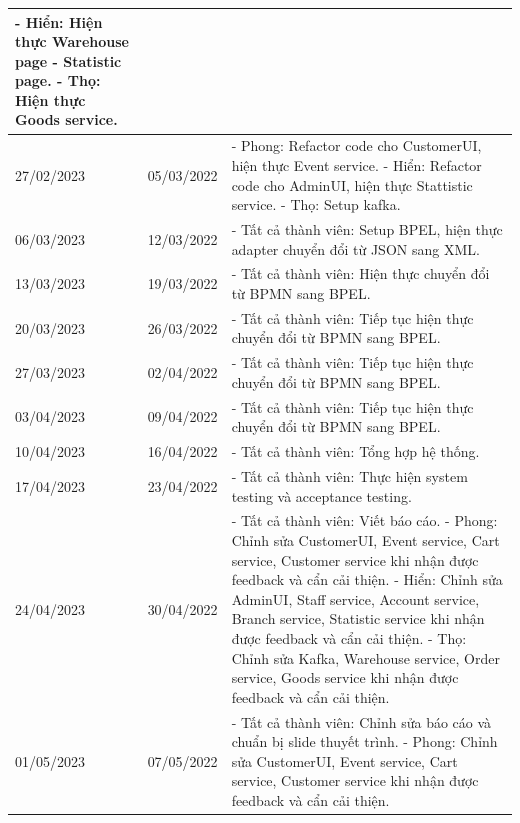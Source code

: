 \begin{longtable}{| p{2cm} | p{2cm} | p{10cm} |}
    \newline
    - Hiển: Hiện thực Warehouse page - Statistic page. 
    \newline
    - Thọ: Hiện thực Goods service. \\
	\hline
	27/02/2023 & 05/03/2022 & 
    - Phong: Refactor code cho CustomerUI, hiện thực Event service. 
    \newline
    - Hiển: Refactor code cho AdminUI, hiện thực Stattistic service. 
    \newline
    - Thọ: Setup kafka. \\
	\hline
	06/03/2023 & 12/03/2022 & 
    - Tất cả thành viên: Setup BPEL, hiện thực adapter chuyển đổi từ JSON sang XML. \\
	\hline
	13/03/2023 & 19/03/2022 & 
    - Tất cả thành viên: Hiện thực chuyển đổi từ BPMN sang BPEL. \\
	\hline
	20/03/2023 & 26/03/2022 & 
    - Tất cả thành viên: Tiếp tục hiện thực chuyển đổi từ BPMN sang BPEL. \\
	\hline
	27/03/2023 & 02/04/2022 & 
    - Tất cả thành viên: Tiếp tục hiện thực chuyển đổi từ BPMN sang BPEL. \\
	\hline
	03/04/2023 & 09/04/2022 & 
    - Tất cả thành viên: Tiếp tục hiện thực chuyển đổi từ BPMN sang BPEL. \\
	\hline
	10/04/2023 & 16/04/2022 & 
    - Tất cả thành viên: Tổng hợp hệ thống. \\
	\hline
	17/04/2023 & 23/04/2022 & 
    - Tất cả thành viên: Thực hiện system testing và acceptance testing. \\
	\hline
	24/04/2023 & 30/04/2022 & 
    - Tất cả thành viên: Viết báo cáo.
    \newline
    - Phong: Chỉnh sửa CustomerUI, Event service, Cart service, Customer service khi nhận được feedback và cẩn cải thiện. 
    \newline
    - Hiển: Chỉnh sửa AdminUI, Staff service, Account service, Branch service, Statistic service khi nhận được feedback và cẩn cải thiện. 
    \newline
    - Thọ: Chỉnh sửa Kafka, Warehouse service, Order service, Goods service khi nhận được feedback và cẩn cải thiện. \\
	\hline
	01/05/2023 & 07/05/2022 & 
    - Tất cả thành viên: Chỉnh sửa báo cáo và chuẩn bị slide thuyết trình.
    \newline
    - Phong: Chỉnh sửa CustomerUI, Event service, Cart service, Customer service khi nhận được feedback và cẩn cải thiện. 
    \newline

\end{longtable}
